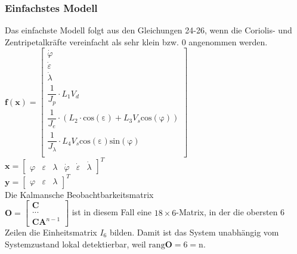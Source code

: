 \documentclass[times, 10pt,twocolumn]{article}
\begin{document}
	\subsubsection{Einfachstes Modell}
	Das einfachste Modell folgt aus den Gleichungen 24-26, wenn die Coriolis- und Zentripetalkräfte vereinfacht als sehr klein bzw. 0 angenommen werden. \\
	$\bm f(\bm x) = \begin{bmatrix}
	\dot \varphi \\
	\dot \varepsilon \\
	\dot \lambda  \\
	\dfrac{1}{J_p} \cdot L_1 V_d \\
	\dfrac{1}{J_e} \cdot (L_2 \cdot \mathrm{cos(\varepsilon)} + L_3 V_s \mathrm{cos(\varphi)}) \\
	\dfrac{1}{J_{\lambda}} \cdot L_4 V_s \mathrm{cos(\varepsilon)} \mathrm{sin(\varphi)} \\
	\end{bmatrix} $ \\
	$\bm x = \begin{bmatrix}
	\varphi & \varepsilon & \lambda & \dot \varphi & \dot \varepsilon & \dot \lambda 
	\end{bmatrix}^T $ \\
	$\bm y = \begin{bmatrix}
	\varphi & \varepsilon & \lambda 
	\end{bmatrix}^T $ \\
	Die Kalmansche Beobachtbarkeitsmatrix \\ $\bm O = \begin{bmatrix}
	\bm C \\
	... \\
	\bm C \bm A^{n-1}
	\end{bmatrix}$ ist in diesem Fall eine $18\times 6$-Matrix, in der die obersten 6 Zeilen die Einheitsmatrix $I_6$ bilden. Damit ist das System unabhängig vom Systemzustand lokal detektierbar, weil $\mathrm{rang} \bm O = 6 = \mathrm{n}$.
\end{document}
